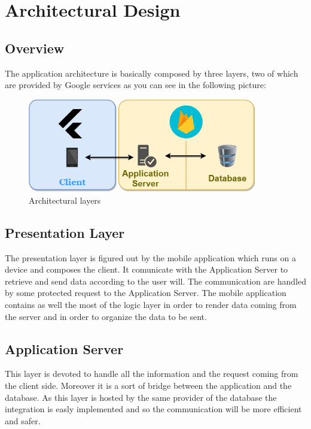 \chapter{Architectural Design}

\section{Overview}
	The application architecture is basically composed by three layers, two of which are provided by Google services as you can see in the following picture:

	\begin{figure}[H]
		\begin{center}
			\includegraphics[width=10cm]{img/CookingTime_Architecture.png}
			\caption{Architectural layers}
			\label{Fig:ArchitecturalLayers}
		\end{center}
	\end{figure}

\section{Presentation Layer}
	The presentation layer is figured out by the mobile application which runs on a device and composes the client. 
	It comunicate with the Application Server to retrieve and send data according to the user will. 
	The communication are handled by some protected request to the Application Server. 
	The mobile application contains as well the most of the logic layer in order to render data coming from the server and in order to organize the data to be sent.

\section{Application Server}
	This layer is devoted to handle all the information and the request coming from the client side. 
	Moreover it is a sort of bridge between the application and the database. 
	As this layer is hosted by the same provider of the database the integration is easly implemented and so the communication will be more efficient and safer.

